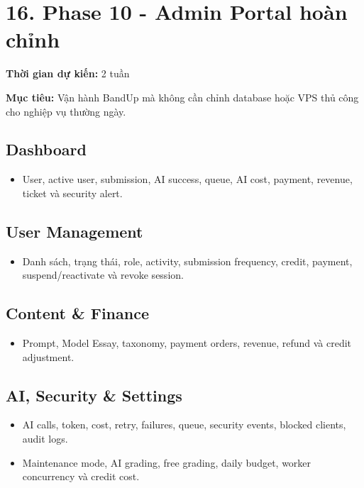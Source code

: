 \documentclass[
  11pt,
  a4paper,
]{article}
\begin{document}
\section{16. Phase 10 - Admin Portal hoàn
chỉnh}\label{phase-10---admin-portal-houxe0n-chux1ec9nh}

\textbf{Thời gian dự kiến:} 2 tuần

\textbf{Mục tiêu:} Vận hành BandUp mà không cần chỉnh database hoặc VPS
thủ công cho nghiệp vụ thường ngày.

\subsection{Dashboard}\label{dashboard}

\begin{itemize}
\item
  User, active user, submission, AI success, queue, AI cost, payment,
  revenue, ticket và security alert.
\end{itemize}

\subsection{User Management}\label{user-management}

\begin{itemize}
\item
  Danh sách, trạng thái, role, activity, submission frequency, credit,
  payment, suspend/reactivate và revoke session.
\end{itemize}

\subsection{Content \& Finance}\label{content-finance}

\begin{itemize}
\item
  Prompt, Model Essay, taxonomy, payment orders, revenue, refund và
  credit adjustment.
\end{itemize}

\subsection{AI, Security \& Settings}\label{ai-security-settings}

\begin{itemize}
\item
  AI calls, token, cost, retry, failures, queue, security events,
  blocked clients, audit logs.
\item
  Maintenance mode, AI grading, free grading, daily budget, worker
  concurrency và credit cost.
\end{itemize}
\end{document}
